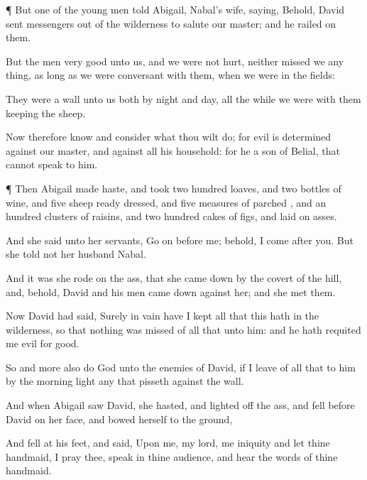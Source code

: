 {\par }{\PP {}¶ But
one of the young
men
told
Abigail,
Nabal’s
wife,
saying, Behold,
David
sent
messengers out of the
wilderness to
salute our
master; and he
railed on them.

But the
men
{}
very
good unto us, and we were not
hurt, neither
missed we any
thing, as long
as we were
conversant with them, when we were in the
fields:

They were a
wall unto us both by
night and
day, all the
while we were with them
keeping the
sheep.

Now therefore
know and
consider what thou wilt
do; for
evil is
determined against our
master, and against all his
household: for he
{} a
son of
Belial, that
{} cannot
speak to him.


\par }{\PP {}¶ Then
Abigail made
haste, and
took two
hundred
loaves, and
two
bottles of
wine, and
five
sheep ready
dressed, and
five
measures of
parched
{}, and an
hundred clusters of
raisins, and two
hundred
cakes of figs, and
laid
{} on
asses.

And she
said unto her
servants, Go
on
before me; behold, I
come
after you. But she
told not her
husband
Nabal.

And it was
{} she
rode on the
ass, that she came
down by the
covert of the
hill, and, behold,
David and his
men came
down
against her; and she
met them.

Now
David had
said, Surely in
vain have I
kept all that
this
{} hath in the
wilderness, so that
nothing was
missed of all that
{} unto him: and he hath
requited me
evil for
good.

So and
more also
do
God unto the
enemies of
David, if I
leave of all that
{} to him
by the
morning
light any that
pisseth against the
wall.

And when
Abigail
saw
David, she
hasted, and lighted
off the
ass, and
fell
before
David on her
face, and
bowed herself to the
ground,

And
fell at his
feet, and
said, Upon me, my
lord,
{} me
{}
iniquity
{} and let thine
handmaid, I pray thee,
speak in thine
audience, and
hear the
words of thine
handmaid.

}

